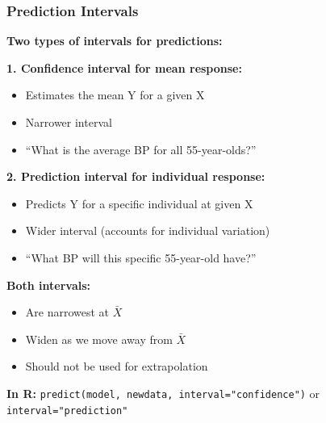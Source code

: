 \documentclass{beamer}
\begin{document}
\begin{frame}
\frametitle{Prediction Intervals}
\textbf{Two types of intervals for predictions:}

\vspace{0.3cm}
\textbf{1. Confidence interval for mean response:}
\begin{itemize}
\item Estimates the mean Y for a given X
\item Narrower interval
\item ``What is the average BP for all 55-year-olds?''
\end{itemize}

\vspace{0.3cm}
\textbf{2. Prediction interval for individual response:}
\begin{itemize}
\item Predicts Y for a specific individual at given X
\item Wider interval (accounts for individual variation)
\item ``What BP will this specific 55-year-old have?''
\end{itemize}

\vspace{0.5cm}
\textbf{Both intervals:}
\begin{itemize}
\item Are narrowest at $\bar{X}$
\item Widen as we move away from $\bar{X}$
\item Should not be used for extrapolation
\end{itemize}

\vspace{0.3cm}
\textbf{In R:} \texttt{predict(model, newdata, interval="confidence")} or \texttt{interval="prediction"}
\end{frame}
\end{document}

